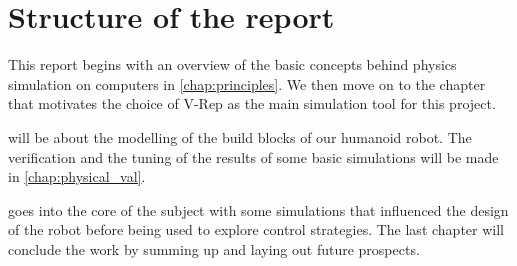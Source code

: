 \section{Structure of the report}
This report begins with an overview of the basic concepts behind physics simulation on computers in \cref{chap:principles}. We then move on to the chapter that motivates the choice of V-Rep as the main simulation tool for this project.

 will be about the modelling of the build blocks of our humanoid robot. The verification and the tuning of the results of some basic simulations will be made in \cref{chap:physical_val}.

 goes into the core of the subject with some simulations that influenced the design of the robot before being used to explore control strategies. The last chapter will conclude the work by summing up and laying out future prospects.